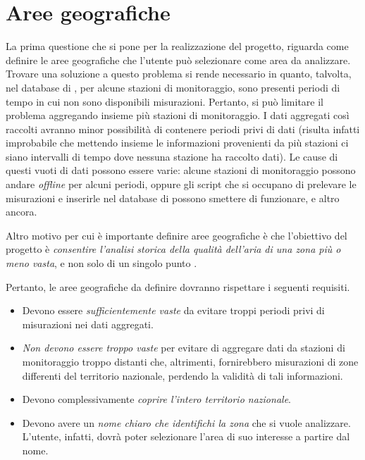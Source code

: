 \section{Aree geografiche}\label{sec:areas}

La prima questione che si pone per la realizzazione del progetto, riguarda come
definire le aree geografiche che l'utente può selezionare come area da
analizzare. Trovare una soluzione a questo problema si rende necessario in
quanto, talvolta, nel database di \MonIQA{}, per alcune stazioni di
monitoraggio, sono presenti periodi di tempo in cui non sono disponibili
misurazioni.  Pertanto, si può limitare il problema aggregando insieme più
stazioni di monitoraggio. I dati aggregati così raccolti avranno minor
possibilità di contenere periodi privi di dati (risulta infatti improbabile che
mettendo insieme le informazioni provenienti da più stazioni ci siano intervalli
di tempo dove nessuna stazione ha raccolto dati). Le cause di questi vuoti di
dati possono essere varie: alcune stazioni di monitoraggio possono andare
\textit{offline} per alcuni periodi, oppure gli script che si occupano di
prelevare le misurazioni e inserirle nel database di \MonIQA{} possono smettere
di funzionare, e altro ancora.

Altro motivo per cui è importante definire aree geografiche è che l'obiettivo
del progetto è \emph{consentire l'analisi storica della qualità dell'aria di una
zona più o meno vasta}, e non solo di un singolo punto .

Pertanto, le aree geografiche da definire dovranno rispettare i seguenti
requisiti.
\begin{itemize}
	\item Devono essere \emph{sufficientemente vaste} da evitare troppi
		periodi privi di misurazioni nei dati aggregati.
	\item \emph{Non devono essere troppo vaste} per evitare di aggregare
		dati da stazioni di monitoraggio troppo distanti che,
		altrimenti, fornirebbero misurazioni di zone differenti del
		territorio nazionale, perdendo la validità di tali informazioni.
	\item Devono complessivamente \emph{coprire l'intero territorio
		nazionale}.
	\item Devono avere un \emph{nome chiaro che identifichi la zona} che si
		vuole analizzare. L'utente, infatti, dovrà poter selezionare
		l'area di suo interesse a partire dal nome.
\end{itemize}

